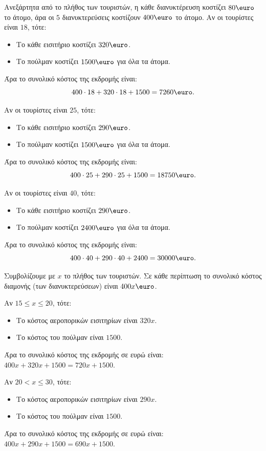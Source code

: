 
\begin{alist}
\item Ανεξάρτητα από το πλήθος των τουριστών, η κάθε διανυκτέρευση κοστίζει $80\text{\euro}$ το άτομο, άρα οι $5$ διανυκτερεύσεις κοστίζουν $400\text{\euro}$ το άτομο.
Αν οι τουρίστες είναι $18$, τότε:
\begin{itemize}
\item Το κάθε εισιτήριο κοστίζει $320\text{\euro}$.
\item Το πούλμαν κοστίζει $1500\text{\euro}$ για όλα τα άτομα.
\end{itemize}
Άρα το συνολικό κόστος της εκδρομής είναι:
\[400 \cdot 18 + 320 \cdot 18 + 1500 = 7260\text{\euro}.\]

Αν οι τουρίστες είναι $25$, τότε:
\begin{itemize}
\item Το κάθε εισιτήριο κοστίζει $290\text{\euro}$.
\item Το πούλμαν κοστίζει $1500\text{\euro}$ για όλα τα άτομα.
\end{itemize}
Άρα το συνολικό κόστος της εκδρομής είναι:
\[400 \cdot 25 + 290 \cdot 25 + 1500 = 18750\text{\euro}.\]

Αν οι τουρίστες είναι $40$, τότε:
\begin{itemize}
\item Το κάθε εισιτήριο κοστίζει $290\text{\euro}$.
\item Το πούλμαν κοστίζει $2400\text{\euro}$ για όλα τα άτομα.
\end{itemize}
Άρα το συνολικό κόστος της εκδρομής είναι:
\[400 \cdot 40 + 290 \cdot 40 + 2400 = 30000\text{\euro}.\]

\item Συμβολίζουμε με $x$ το πλήθος των τουριστών. Σε κάθε περίπτωση το συνολικό κόστος διαμονής (των διανυκτερεύσεων) είναι $400x\text{\euro}$.
\begin{rlist}
\item Αν $15 \le x \le 20$, τότε:
\begin{itemize}
\item Το κόστος αεροπορικών εισιτηρίων είναι $320x$.
\item Το κόστος του πούλμαν είναι $1500$.
\end{itemize}
Άρα το συνολικό κόστος της εκδρομής σε ευρώ είναι:
$400x + 320x + 1500 = 720x + 1500$.

\item Αν $20 < x \le 30$, τότε:
\begin{itemize}
\item Το κόστος αεροπορικών εισιτηρίων είναι $290x$.
\item Το κόστος του πούλμαν είναι $1500$.
\end{itemize}
Άρα το συνολικό κόστος της εκδρομής σε ευρώ είναι:
$400x + 290x + 1500 = 690x + 1500$.


\end{rlist}
\end{alist}
